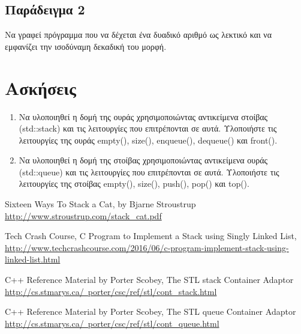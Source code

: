 

\subsection{Παράδειγμα 2}
Να γραφεί πρόγραμμα που να δέχεται ένα δυαδικό αριθμό ως λεκτικό και να εμφανίζει την ισοδύναμη δεκαδική του μορφή.





\section{Ασκήσεις}
\begin{enumerate}[nolistsep]
\item Να υλοποιηθεί η δομή της ουράς χρησιμοποιώντας αντικείμενα στοίβας (std::stack) και τις λειτουργίες που επιτρέπονται σε αυτά. Υλοποιήστε τις λειτουργίες της ουράς empty(), size(), enqueue(), dequeue() και front().
\item Να υλοποιηθεί η δομή της στοίβας χρησιμοποιώντας αντικείμενα ουράς (std::queue) και τις λειτουργίες που επιτρέπονται σε αυτά. Υλοποιήστε τις λειτουργίες της στοίβας empty(), size(), push(), pop() και top().
\end{enumerate}

\begin{thebibliography}{9}
Sixteen Ways To Stack a Cat, by Bjarne Stroustrup \href{http://www.stroustrup.com/stack_cat.pdf}{http://www.stroustrup.com/stack\_cat.pdf}

Tech Crash Course,  C Program to Implement a Stack using Singly Linked List, \href{http://www.techcrashcourse.com/2016/06/c-program-implement-stack-using-linked-list.html}{http://www.techcrashcourse.com/2016/06/c-program-implement-stack-using-linked-list.html}

C++ Reference Material by Porter Scobey, The STL stack Container Adaptor \href{http://cs.stmarys.ca/~porter/csc/ref/stl/cont_stack.html}{http://cs.stmarys.ca/~porter/csc/ref/stl/cont\_stack.html}

C++ Reference Material by Porter Scobey, The STL queue Container Adaptor \href{http://cs.stmarys.ca/~porter/csc/ref/stl/cont_queue.html}{http://cs.stmarys.ca/~porter/csc/ref/stl/cont\_queue.html}

\end{thebibliography}

